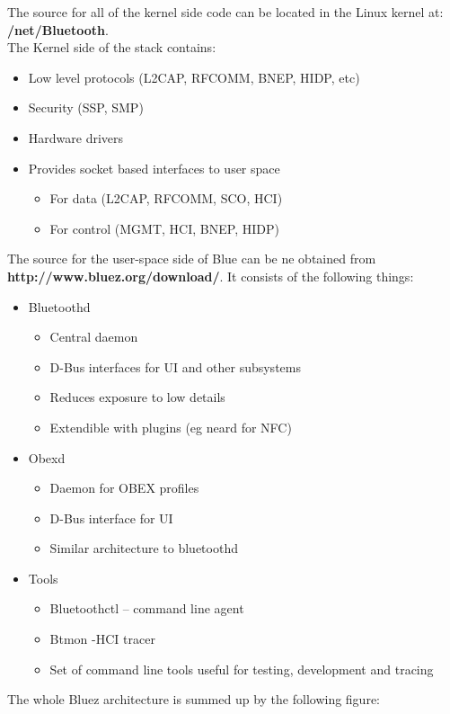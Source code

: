 The source for all of the kernel side code can be located in the Linux kernel at: \textbf{/net/Bluetooth}.\\
The Kernel side of the stack contains:
\begin{itemize}
	\item Low level protocols (L2CAP, RFCOMM, BNEP, HIDP, etc)
	\item Security (SSP, SMP)
	\item Hardware drivers
	\item Provides socket based interfaces to user space
	\begin{itemize}
		\item For data (L2CAP, RFCOMM, SCO, HCI)
		\item For control (MGMT, HCI, BNEP, HIDP)
	\end{itemize}
\end{itemize}
The source for the user-space side of Blue can be ne obtained from \textbf{http://www.bluez.org/download/}. It consists of the following things:
\begin{itemize}
	\item Bluetoothd
	\begin{itemize}
		\item Central daemon
		\item D-Bus interfaces for UI and other subsystems
		\item Reduces exposure to low details
		\item Extendible with plugins (eg neard for NFC)
	\end{itemize}
	\item Obexd
	\begin{itemize}
		\item Daemon for OBEX profiles
		\item D-Bus interface for UI
		\item Similar architecture to bluetoothd
	\end{itemize}
	\item Tools
	\begin{itemize}	
		\item Bluetoothctl – command line agent
		\item Btmon -HCI tracer
		\item Set of command line tools useful for testing, development and tracing
	\end{itemize}
\end{itemize}
The whole Bluez architecture is summed up by the following figure:
